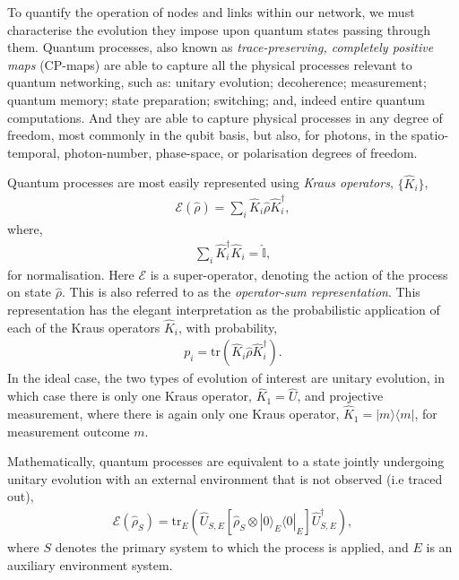 \documentclass[aps, rmp, twocolumn, amsmath, amssymb, nofootinbib, superscriptaddress, longbibliography, floatfix, table-of-contents, eqsecnum]{revtex4-1}
\newcommand{\bra}[1]{\langle#1|}
\newcommand{\ket}[1]{|#1\rangle}
\begin{document}
To quantify the operation of nodes and links within our network, we must characterise the evolution they impose upon quantum states passing through them. Quantum processes, also known as \textit{trace-preserving, completely positive maps} (CP-maps) are able to capture all the physical processes relevant to quantum networking, such as: unitary evolution; decoherence; measurement; quantum memory; state preparation; switching; and, indeed entire quantum computations. And they are able to capture physical processes in any degree of freedom, most commonly in the qubit basis, but also, for photons, in the spatio-temporal, photon-number, phase-space, or polarisation degrees of freedom.

Quantum processes are most easily represented using \textit{Kraus operators}, $\{\hat{K}_i\}$,
\begin{align} \label{eq:kraus_rep}
\mathcal{E}(\hat\rho) = \sum_i \hat{K}_i \hat\rho \hat{K}_i^\dag,
\end{align}
where,
\begin{align}
\sum_i \hat{K}_i^\dag \hat{K}_i = \hat{\mathbb{I}},
\end{align}
for normalisation. Here $\mathcal{E}$ is a super-operator, denoting the action of the process on state $\hat\rho$. This is also referred to as the \textit{operator-sum representation}. This representation has the elegant interpretation as the probabilistic application of each of the Kraus operators $\hat{K}_i$, with probability,
\begin{align}
p_i = \text{tr}(\hat{K}_i \hat\rho \hat{K}_i^\dag).
\end{align}
In the ideal case, the two types of evolution of interest are unitary evolution, in which case there is only one Kraus operator, \mbox{$\hat{K}_1=\hat{U}$}, and projective measurement, where there is again only one Kraus operator, \mbox{$\hat{K}_1=\ket{m}\bra{m}$}, for measurement outcome $m$.

Mathematically, quantum processes are equivalent to a state jointly undergoing unitary evolution with an external environment that is not observed (i.e traced out),
\begin{align} \label{eq:proc_environment}
\mathcal{E}(\hat\rho_S) = \text{tr}_E (\hat{U}_{S,E} [\hat\rho_S\otimes \ket{0}_E\bra{0}_E] \hat{U}^\dag_{S,E}),
\end{align}
where $S$ denotes the primary system to which the process is applied, and $E$ is an auxiliary environment system.
\end{document}
